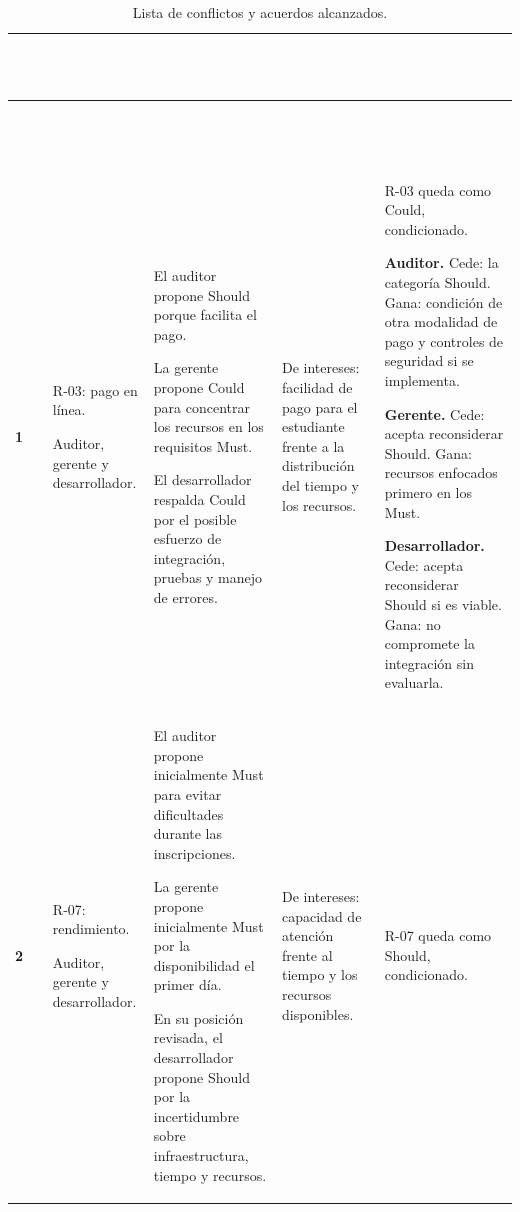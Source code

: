 \documentclass[12pt,a4paper]{article}
\newcommand{\cabecera}[1]{
    \textcolor{white}{\textbf{#1}}
}
\begin{document}
\begin{longtable}{
    C{0.8cm}
    L{2.5cm}
    L{3.5cm}
    L{2.2cm}
    L{5.1cm}
}

\caption{Lista de conflictos y acuerdos alcanzados.}
\label{tab:conflictos}\\

\cabecera{N.º} &
\cabecera{Requisitos y roles} &
\cabecera{Posición de cada rol} &
\cabecera{Tipo de conflicto} &
\cabecera{Acuerdo: qué cede y qué gana cada rol} \\

\endfirsthead

\cabecera{N.º} &
\cabecera{Requisitos y roles} &
\cabecera{Posición de cada rol} &
\cabecera{Tipo de conflicto} &
\cabecera{Acuerdo: qué cede y qué gana cada rol} \\

\endhead

\bottomrule

\endfoot

\textbf{1} &
R-03: pago en línea.

Auditor, gerente y desarrollador. &
El auditor propone Should porque facilita el pago.

La gerente propone Could para concentrar los recursos
en los requisitos Must.

El desarrollador respalda Could por el posible esfuerzo
de integración, pruebas y manejo de errores. &
De intereses: facilidad de pago para el estudiante
frente a la distribución del tiempo y los recursos. &
R-03 queda como Could, condicionado.

\textbf{Auditor.} Cede: la categoría Should.
Gana: condición de otra modalidad de pago y controles
de seguridad si se implementa.

\textbf{Gerente.} Cede: acepta reconsiderar Should.
Gana: recursos enfocados primero en los Must.

\textbf{Desarrollador.} Cede: acepta reconsiderar
Should si es viable. Gana: no compromete la integración
sin evaluarla. \\

\textbf{2} &
R-07: rendimiento.

Auditor, gerente y desarrollador. &
El auditor propone inicialmente Must para evitar
dificultades durante las inscripciones.

La gerente propone inicialmente Must por la
disponibilidad el primer día.

En su posición revisada, el desarrollador propone
Should por la incertidumbre sobre infraestructura,
tiempo y recursos. &
De intereses: capacidad de atención frente al
tiempo y los recursos disponibles. &
R-07 queda como Should, condicionado.


\end{longtable}
\end{document}
